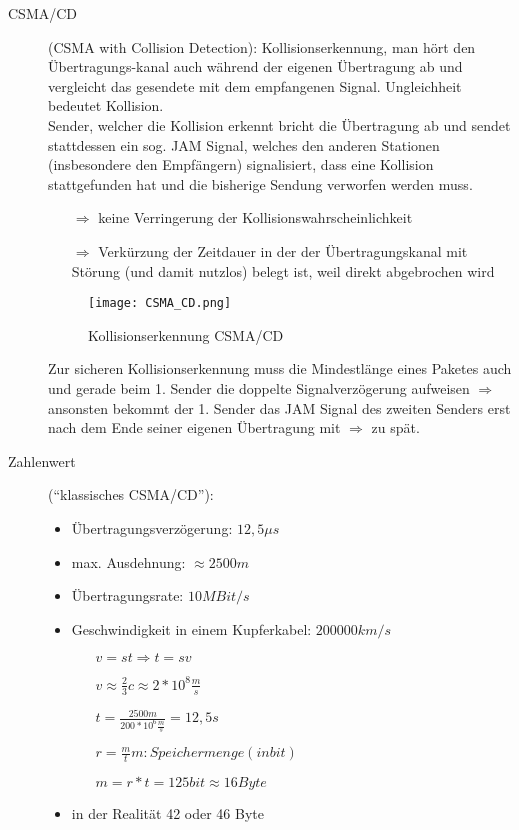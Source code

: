 \begin{description}
\item[CSMA/CD] (CSMA with Collision Detection): Kollisionserkennung, man hört den Übertragungs-kanal auch während der eigenen Übertragung ab und vergleicht das gesendete mit dem empfangenen Signal. Ungleichheit bedeutet Kollision.\\
Sender, welcher die Kollision erkennt bricht die Übertragung ab und sendet stattdessen ein sog. JAM Signal, welches den anderen Stationen (insbesondere den Empfängern) signalisiert, dass eine Kollision stattgefunden hat und die bisherige Sendung verworfen werden muss.
\begin{itemize}
\item[$\Rightarrow$] keine Verringerung der Kollisionswahrscheinlichkeit 
\item[$\Rightarrow$] Verkürzung der Zeitdauer in der der Übertragungskanal mit Störung (und damit nutzlos) belegt ist, weil direkt abgebrochen wird
\end{itemize}
    
\begin{figure}[htbp]
  \centering
  \texttt{[image: CSMA\_CD.png]}
  \caption{Kollisionserkennung CSMA/CD}
\end{figure}

Zur sicheren Kollisionserkennung muss die Mindestlänge eines Paketes auch und gerade beim 1. Sender die doppelte Signalverzögerung aufweisen $\Rightarrow$ ansonsten bekommt der 1. Sender das JAM Signal des zweiten Senders erst nach dem Ende seiner eigenen Übertragung mit $\Rightarrow$ zu spät.

\item[Zahlenwert] (“klassisches CSMA/CD”):
\begin{itemize}
\item Übertragungsverzögerung: $12,5\mu s$
\item max. Ausdehnung: $\approx2500m$
\item Übertragungsrate: $10MBit/s$
\item Geschwindigkeit in einem Kupferkabel: $200 000 km/s$
\begin{itemize}
\item[]$v=st \Rightarrow t=sv$
\item[]$v\approx\frac{2}{3}c\approx2*10^{8}\frac{m}{s}$
\item[]$t=\frac{2500m}{200*10^{6}\frac{m}{s}}=12,5s$
\item[]$r=\frac{m}{t} m:Speichermenge (in bit)$
\item[]$m=r*t=125bit \approx 16Byte$
\end{itemize}
\item in der Realität 42 oder 46 Byte


\end{itemize}
\end{description}

